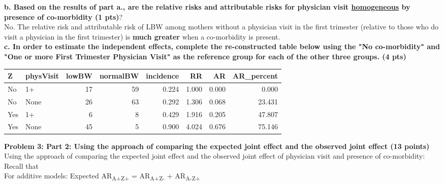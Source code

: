 \documentclass[12pt]{article}
\begin{document}
\noindent \textbf{b. Based on the results of part a., are the relative risks and attributable risks for physician visit \underline{homogeneous} by presence of co-morbidity (1 pts)}? \\

No.  The relative risk and attributable risk of LBW among mothers without a physician visit in the first trimester (relative to those who do visit a physician in the first trimester) is \textbf{much greater} when a co-morbidity is present. \\

\noindent \textbf{c. In order to estimate the independent effects, complete the re-constructed table below using the "No co-morbidity" and "One or more First Trimester Physician Visit" as the reference group for each of the other three groups. (4 pts)}


\begin{table}[H]
\caption*{Problem 4 c}
\begin{table}[ht]
\centering
\begin{tabular}{llrrrrrr}
  \hline
Z & physVisit & lowBW & normalBW & incidence & RR & AR & AR\_percent \\ 
  \hline
No & 1+ & 17 & 59 & 0.224 & 1.000 & 0.000 & 0.000 \\ 
  No & None & 26 & 63 & 0.292 & 1.306 & 0.068 & 23.431 \\ 
  Yes & 1+ & 6 & 8 & 0.429 & 1.916 & 0.205 & 47.807 \\ 
  Yes & None & 45 & 5 & 0.900 & 4.024 & 0.676 & 75.146 \\ 
   \hline
\end{tabular}
\end{table}\end{table}

\newpage

\noindent \textbf{Problem 3: Part 2: Using the approach of comparing the expected joint effect and the observed joint effect (13 points)} \\

Using the approach of comparing the expected joint effect and the observed joint effect of physician visit and presence of co-morbidity: \\

Recall that \\

For additive models: Expected AR\textsubscript{A+Z+} = AR\textsubscript{A+Z-} + AR\textsubscript{A-Z+} \\
\end{document}
